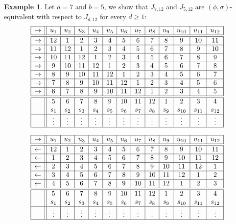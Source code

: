 \documentclass{amsart}
\theoremstyle{definition}
\newtheorem{ex}[prop]{Example}
\numberwithin{equation}{section}
\begin{document}
\begin{ex}
Let $a = 7$ and $b = 5$, we show that $J_{7,12}$ and  $J_{5,12}$ are $(\phi,\sigma)$-equivalent with respect to $J_{d,12}$ for every $d\geq1$:
\[
\begin{array}{|c||c|c|c|c|c|c|c|c|c|c|c|c|}\hline
\rightarrow&u_1&u_2&u_3&u_4&u_5&u_6&u_7&u_8&u_9&u_{10}&u_{11}&u_{12}  \\ \hline \hline
\rightarrow&12&1&2&3&4&5&6&7&8&9&10&11 \\ \hline
\rightarrow&11&12&1&2&3&4&5&6&7&8&9&10\\ \hline
\rightarrow&10&11&12&1&2&3&4&5&6&7&8&9\\ \hline
\rightarrow&9&10&11&12&1&2&3&4&5&6&7&8\\ \hline
\rightarrow&8&9&10&11&12&1&2&3&4&5&6&7\\ \hline 
\rightarrow&7&8&9&10&11&12&1&2&3&4&5&6\\ \hline
 \rightarrow&6&7&8&9&10&11&12&1&2&3&4&5\\ \hline \hline
&5&6&7&8&9&10&11&12&1&2&3&4\\
&s_1&s_2&s_3&s_4&s_5&s_6&s_7&s_8&s_9&s_{10}&s_{11}&s_{12} \\ \hline 
 & \vdots & \vdots & \vdots & \vdots & \vdots & \vdots & \vdots & \vdots & \vdots & \vdots & \vdots & \vdots   \\ \hline
\end{array}
\]

\[
\begin{array}{|c||c|c|c|c|c|c|c|c|c|c|c|c|}\hline
\rightarrow&u_1&u_2&u_3&u_4&u_5&u_6&u_7&u_8&u_9&u_{10}&u_{11}&u_{12}  \\ \hline \hline
\leftarrow &12&1&2&3&4&5&6&7&8&9&10&11 \\ \hline
\leftarrow&1&2&3&4&5&6&7&8&9&10&11&12 \\ \hline 
\leftarrow&2&3&4&5&6&7&8&9&10&11&12&1 \\ \hline
\leftarrow&3&4&5&6&7&8&9&10&11&12&1&2 \\ \hline
\leftarrow&4&5&6&7&8&9&10&11&12&1&2&3 \\ \hline \hline
             &5&6&7&8&9&10&11&12&1&2&3&4 \\ 
&s_1&s_2&s_3&s_4&s_5&s_6&s_7&s_8&s_9&s_{10}&s_{11}&s_{12} \\\hline
 & \vdots & \vdots & \vdots & \vdots & \vdots & \vdots & \vdots & \vdots & \vdots & \vdots & \vdots & \vdots   \\ \hline
\end{array}
\]
\end{ex}
\end{document}
